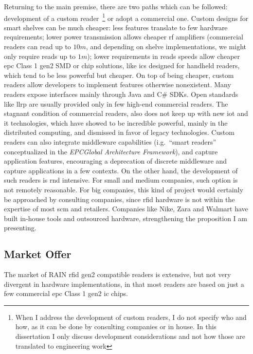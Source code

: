 Returning to the main premise, there are two paths which can be followed: development of a custom reader~\footnote{When I address the development of custom readers, I do not specify who and how, as it can be done by consulting companies or in house. In this dissertation I only discuss development considerations and not how those are translated to engineering work} or adopt a commercial one. 
Custom designs for smart shelves can be much cheaper: less features translate to few hardware requirements; lower power transmission allows cheaper \ac{rf} amplifiers (commercial readers can read up to $10m$, and depending on shelve implementations, we might only require reads up to $1m$); lower requirements in reads speeds allow cheaper \ac{epc} Class 1 \ac{gen2} SMD or chip solutions, like \acp{ic} designed for handheld readers, which tend to be less powerful but cheaper.
On top of being cheaper, custom readers allow developers to implement features otherwise nonexistent. Many readers expose interfaces mainly through Java and C\# SDKs. Open standards like \ac{llrp} are usually provided only in few high-end commercial readers. The stagnant condition of commercial readers, also does not keep up with new \ac{iot} and \ac{it} technologies, which have showed to be incredible powerful, mainly in the distributed computing, and dismissed in favor of legacy technologies.
Custom readers can also integrate middleware capabilities (i.g.\ ``smart readers'' conceptualized in the \emph{EPCGlobal Architecture Framework}), and capture application features, encouraging a deprecation of discrete middleware and capture applications in a few contexts.
On the other hand, the development of such readers is \ac{rnd} intensive. For small and medium companies, such option is not remotely reasonable. 
For big companies, this kind of project would certainly be approached by consulting companies, since \ac{rfid} hardware is not within the expertise of most \ac{scm} and retailers. Companies like Nike, Zara and Walmart have built in-house tools and outsourced hardware, strengthening the proposition I am presenting.

\subsection{Market Offer}

The market of RAIN \ac{rfid} \ac{gen2} compatible readers is extensive, but not very divergent in hardware implementations, in that most readers are based on just a few commercial \ac{epc} Class 1 \ac{gen2} \ac{ic} chips.

